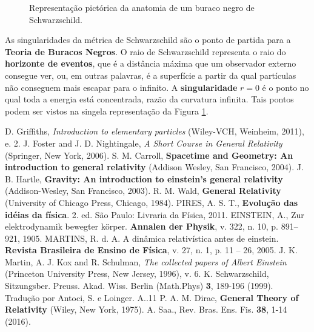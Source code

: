 \documentclass[12pt,a4paper,titlepage,brazil]{article}
\begin{document}
\begin{figure}[h!]
\centering
{}
\caption{\label{buraconegro} Representação pictórica da anatomia de um buraco negro de Schwarzschild.}
\end{figure}

As singularidades da métrica de Schwarzschild são o ponto de partida para a {\bf Teoria de Buracos Negros}. O raio de Schwarzschild representa o raio do \textbf{horizonte de eventos}, que é a distância máxima que um observador externo consegue ver, ou, em outras palavras, é a superfície a partir da qual partículas não conseguem mais escapar para o infinito. A {\bf singularidade} $r = 0$ é o ponto no qual toda a energia está concentrada, razão da curvatura infinita. Tais pontos podem ser vistos na singela representação da Figura \ref{buraconegro}. 


\begin{thebibliography}{99}
  D. Griffiths, {\em Introduction to elementary particles} (Wiley-VCH, Weinheim, 2011), e. 2.
  J. Foster and J. D. Nightingale, {\em A Short Course in General Relativity} (Springer, New York, 2006).
  S. M. Carroll, {\bf Spacetime and Geometry: An introduction to general relativity} (Addison Wesley, San Francisco, 2004).
  J. B. Hartle, {\bf Gravity: An introduction to einstein’s general relativity} (Addison-Wesley, San Francisco, 2003).
  R. M. Wald, {\bf General Relativity} (University of Chicago Press, Chicago, 1984).   
  PIRES, A. S. T., {\bf Evolução das idéias da física}. 2. ed. São Paulo: Livraria da Física, 2011. 
  EINSTEIN, A., Zur elektrodynamik bewegter körper. {\bf Annalen der Physik}, v. 322, n. 10, p. 891–921, 1905. 
  MARTINS, R. d. A. A dinâmica relativística antes de einstein. {\bf Revista Brasileira de Ensino de Física}, v. 27, n. 1, p. 11 – 26, 2005.
  J. K. Martin, A. J. Kox and R. Schulman, {\em The collected papers of Albert Einstein} (Princeton University Press, New Jersey, 1996), v. 6.
  K. Schwarzschild, Sitzungsber. Preuss. Akad. Wiss. Berlin (Math.Phys) {\bf 3}, 189-196 (1999). Tradução por Antoci, S. e Loinger. A..11   
  P. A. M. Dirac, {\bf General Theory of Relativity} (Wiley, New York, 1975).   
  A. Saa., Rev. Bras. Ens. Fis. {\bf 38}, 1-14 (2016).
\end{thebibliography}
 
\end{document}
